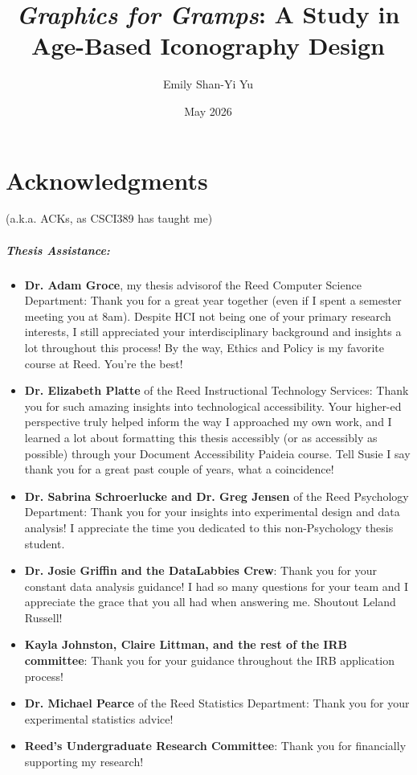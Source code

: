 \documentclass[12pt,twoside]{reedthesis}
\title{\textit{Graphics for Gramps}: A Study in Age-Based Iconography Design}
\author{Emily Shan-Yi Yu}
\date{May 2026}
\begin{document}
  \maketitle
  \frontmatter %
  \pagestyle{empty} %

    \chapter*{Acknowledgments}
    (a.k.a. ACKs, as CSCI389 has taught me)

    \paragraph{Thesis Assistance: }
    \begin{itemize}
        \item \textbf{Dr. Adam Groce}, my thesis advisorof the Reed Computer Science Department: Thank you for a great year together (even if I spent a semester meeting you at 8am). Despite HCI not being one of your primary research interests, I still appreciated your interdisciplinary background and insights a lot throughout this process! By the way, Ethics and Policy is my favorite course at Reed. You're the best!
        \item \textbf{Dr. Elizabeth Platte} of the Reed Instructional Technology Services: Thank you for such amazing insights into technological accessibility. Your higher-ed perspective truly helped inform the way I approached my own work, and I learned a lot about formatting this thesis accessibly (or as accessibly as possible) through your Document Accessibility Paideia course. Tell Susie I say thank you for a great past couple of years, what a coincidence!
        \item \textbf{Dr. Sabrina Schroerlucke and Dr. Greg Jensen} of the Reed Psychology Department: Thank you for your insights into experimental design and data analysis! I appreciate the time you dedicated to this non-Psychology thesis student.
        \item \textbf{Dr. Josie Griffin and the DataLabbies Crew}: Thank you for your constant data analysis guidance! I had so many questions for your team and I appreciate the grace that you all had when answering me. Shoutout Leland Russell! 
        \item \textbf{Kayla Johnston, Claire Littman, and the rest of the IRB committee}: Thank you for your guidance throughout the IRB application process!
        \item \textbf{Dr. Michael Pearce} of the Reed Statistics Department: Thank you for your experimental statistics advice!
        \item \textbf{Reed's Undergraduate Research Committee}: Thank you for financially supporting my research!
    \end{itemize}
\bigbreak
\end{document}
